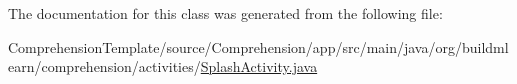 The documentation for this class was generated from the following file\+:\begin{DoxyCompactItemize}
\item 
Comprehension\+Template/source/\+Comprehension/app/src/main/java/org/buildmlearn/comprehension/activities/\hyperlink{ComprehensionTemplate_2source_2Comprehension_2app_2src_2main_2java_2org_2buildmlearn_2comprehensda8a92fcd13a48c8e60cae30156cb02e}{Splash\+Activity.\+java}\end{DoxyCompactItemize}
